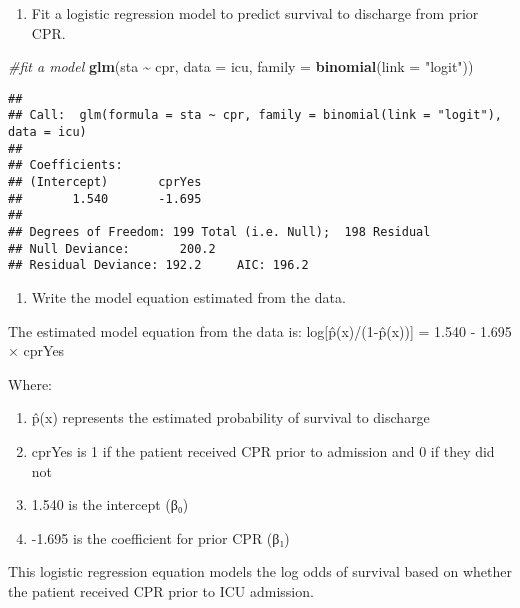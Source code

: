 \documentclass[
]{article}
\newenvironment{Shaded}{\begin{snugshade}}{\end{snugshade}}
\newcommand{\AttributeTok}[1]{\textcolor[rgb]{0.13,0.29,0.53}{#1}}
\newcommand{\CommentTok}[1]{\textcolor[rgb]{0.56,0.35,0.01}{\textit{#1}}}
\newcommand{\FunctionTok}[1]{\textcolor[rgb]{0.13,0.29,0.53}{\textbf{#1}}}
\newcommand{\NormalTok}[1]{#1}
\newcommand{\SpecialCharTok}[1]{\textcolor[rgb]{0.81,0.36,0.00}{\textbf{#1}}}
\newcommand{\StringTok}[1]{\textcolor[rgb]{0.31,0.60,0.02}{#1}}
\providecommand{\tightlist}{%
  \setlength{\itemsep}{0pt}\setlength{\parskip}{0pt}}
\begin{document}
\begin{enumerate}
\def\labelenumi{\arabic{enumi}.}
\setcounter{enumi}{2}
\tightlist
\item
  Fit a logistic regression model to predict survival to discharge from
  prior CPR.
\end{enumerate}

\begin{Shaded}
\begin{Highlighting}[]
\CommentTok{\#fit a model}
\FunctionTok{glm}\NormalTok{(sta }\SpecialCharTok{\textasciitilde{}}\NormalTok{ cpr, }\AttributeTok{data =}\NormalTok{ icu, }\AttributeTok{family =} \FunctionTok{binomial}\NormalTok{(}\AttributeTok{link =} \StringTok{"logit"}\NormalTok{))}
\end{Highlighting}
\end{Shaded}

\begin{verbatim}
## 
## Call:  glm(formula = sta ~ cpr, family = binomial(link = "logit"), data = icu)
## 
## Coefficients:
## (Intercept)       cprYes  
##       1.540       -1.695  
## 
## Degrees of Freedom: 199 Total (i.e. Null);  198 Residual
## Null Deviance:       200.2 
## Residual Deviance: 192.2     AIC: 196.2
\end{verbatim}

\begin{enumerate}
\def\labelenumi{\alph{enumi})}
\tightlist
\item
  Write the model equation estimated from the data.
\end{enumerate}

The estimated model equation from the data is: log{[}p̂(x)/(1-p̂(x)){]} =
1.540 - 1.695 × cprYes

Where:

\begin{enumerate}
\def\labelenumi{\alph{enumi})}
\tightlist
\item
  p̂(x) represents the estimated probability of survival to discharge
\item
  cprYes is 1 if the patient received CPR prior to admission and 0 if
  they did not
\item
  1.540 is the intercept (β₀)
\item
  -1.695 is the coefficient for prior CPR (β₁)
\end{enumerate}

This logistic regression equation models the log odds of survival based
on whether the patient received CPR prior to ICU admission.
\end{document}
